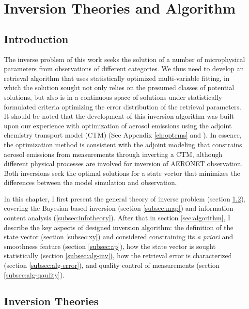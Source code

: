 \chapter{Inversion Theories and Algorithm} \label{ch:algorithm}

\section{Introduction}

The inverse problem of this work seeks the solution of a number of
microphysical parameters from observations of different categories. We
thus need to develop an retrieval algorithm that uses statistically
optimized multi-variable fitting, in which the solution sought not
only relies on the presumed classes of potential solutions, but also is in
a continuous space of solutions under statistically formulated criteria
optimizing the error distribution of the retrieval parameters. 
It should be noted that the development of this inversion algorithm 
was built upon our experience with optimization of aerosol emissions 
using the adjoint chemistry transport model (CTM) 
(See Appendix \ref{ch:optems} and \citep{Wang12, Xu13}). 
In essence, the optimization method is consistent  with the adjoint 
modeling  \citep[e.g.,][]{Henze07} that constrains aerosol emissions 
from measurements through inverting a CTM, although 
different physical processes are involved for inversion of AERONET observation. 
Both inversions seek the optimal solutions for a state vector that minimizes 
the differences between the model simulation and observation.

In this chapter, I first present the general theory of inverse problem (section
\ref{sec:invtheory}), covering the Bayesian-based inversion (section
\ref{subsec:map}) and information content analysis
(\ref{subsec:infotheory}). After that in section \ref{sec:algorithm}, 
I describe the key aspects of  designed inversion algorithm: the
definition of the state vector (section \ref{subsec:xy}) and 
considered constraining its \textit{a priori} and smoothness feature 
(section \ref{subsec:ap}), how the state
vector is sought statistically (section \ref{subsec:alg-inv}), how the retrieval 
error is characterized (section \ref{subsec:alg-error}), and quality
control of measurements (section \ref{subsec:alg-qaulity}).


\section{Inversion Theories} \label{sec:invtheory}

